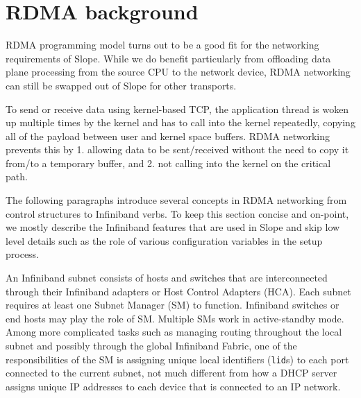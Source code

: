 

\section{RDMA background}
RDMA programming model turns out to be a good fit for the networking
requirements of Slope. While we do benefit particularly from
offloading data plane processing from the source CPU to the network device,
RDMA networking can still be swapped out of Slope for other transports.

To send or receive data using kernel-based TCP, the application thread
is woken up multiple times by the kernel and has to call into the kernel
repeatedly, copying all of the payload between user and kernel space buffers.
RDMA networking prevents this by 1. allowing data to be sent/received without
the need to copy it from/to a temporary buffer, and 2. not calling into the
kernel on the critical path.

The following paragraphs introduce several concepts in RDMA
networking from control structures to Infiniband verbs. To keep this section
concise and on-point, we mostly describe the Infiniband features that are used
in Slope and skip low level details such as the role of various configuration
variables in the setup process.

An Infiniband subnet consists of hosts and switches that are interconnected
through their Infiniband adapters or Host Control Adapters (HCA).
Each subnet requires at least one Subnet Manager (SM) to function.
Infiniband switches or end hosts may play the role of SM. Multiple SMs
work in active-standby mode. Among more complicated tasks such as managing
routing throughout the local subnet and possibly through the global Infiniband
Fabric, one of the responsibilities of the SM is assigning unique local
identifiers (\texttt{lid}s) to each port connected to the current subnet, not much
different from how a DHCP server assigns unique IP addresses to each device
that is connected to an IP network.


